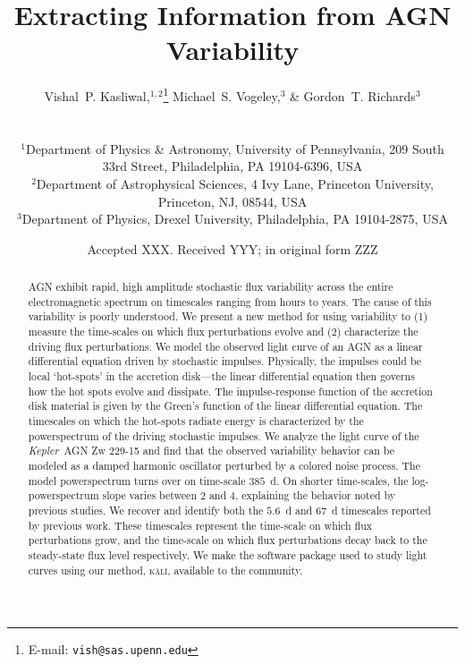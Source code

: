 \documentclass[a4paper,fleqn,usenatbib]{mnras}
\title[Extracting Information from AGN Variability]{Extracting Information from AGN Variability}
\author[V.~P. Kasliwal et al.]{
\parbox{\textwidth}{
Vishal~P. Kasliwal,$^{1,2}$\thanks{E-mail: \texttt{vish@sas.upenn.edu}}
Michael~S. Vogeley,$^{3}$
\& Gordon~T. Richards$^{3}$}\vspace{0.4cm}\
\\
\parbox{\textwidth}{
$^{1}$Department of Physics \& Astronomy, University of Pennsylvania, 209 South 33rd Street, Philadelphia, PA 19104-6396, USA\\
$^{2}$Department of Astrophysical Sciences, 4 Ivy Lane, Princeton University, Princeton, NJ, 08544, USA\\
$^{3}$Department of Physics, Drexel University, Philadelphia, PA 19104-2875, USA\\
}
}
\date{Accepted XXX. Received YYY; in original form ZZZ}
\newcommand{\Kepler}{\textit{Kepler~}}
\begin{document}
\label{firstpage}
\pagerange{\pageref{firstpage}--\pageref{lastpage}}
\maketitle

\begin{abstract}
AGN exhibit rapid, high amplitude stochastic flux variability across the entire electromagnetic spectrum on timescales ranging from hours to years. The cause of this variability is poorly understood. We present a new method for using variability to (1) measure the time-scales on which flux perturbations evolve and (2) characterize the driving flux perturbations. We model the observed light curve of an AGN as a linear differential equation driven by stochastic impulses. Physically, the impulses could be local `hot-spots' in the accretion disk---the linear differential equation then governs how the hot spots evolve and dissipate. The impulse-response function of the accretion disk material is given by the Green's function of the linear differential equation. The timescales on which the hot-spots radiate energy is characterized by the powerspectrum of the driving stochastic impulses. We analyze the light curve of the \Kepler AGN Zw 229-15 and find that the observed variability behavior can be modeled as a damped harmonic oscillator perturbed by a colored noise process. The model powerspectrum turns over on time-scale $385$~d. On shorter time-scales, the log-powerspectrum slope varies between $2$ and $4$, explaining the behavior noted by previous studies. We recover and identify both the $5.6$~d and $67$~d timescales reported by previous work. These timescales represent the time-scale on which flux perturbations grow, and the time-scale on which flux perturbations decay back to the steady-state flux level respectively. We make the software package used to study light curves using our method, \textsc{k\={a}l\={i}}, available to the community.

\end{abstract}
\end{document}
